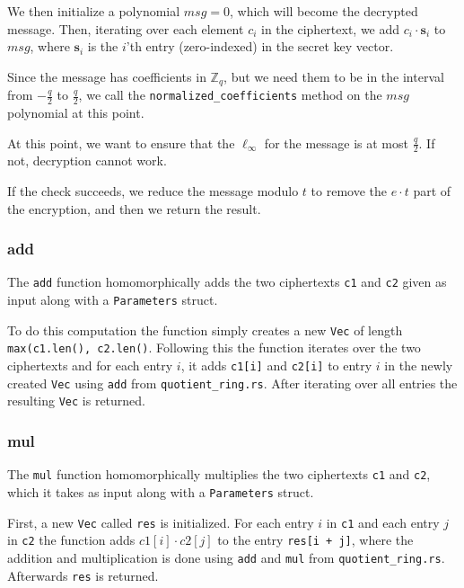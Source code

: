 \documentclass[../main.tex]{subfiles}
\begin{document}
We then initialize a polynomial $msg = 0$, which will become the decrypted message.
Then, iterating over each element $c_i$ in the ciphertext, we add $c_i \cdot \mathbf{s}_i$ to $msg$, where $\mathbf{s}_i$ is the $i$'th entry (zero-indexed) in the secret key vector.

Since the message has coefficients in $\mathbb{Z}_q$, but we need them to be in the interval from $-\frac{q}{2}$ to $\frac{q}{2}$, we call the \lstinline{normalized_coefficients} method on the $msg$ polynomial at this point.

At this point, we want to ensure that the $\ell_\infty$ for the message is at most $\frac{q}{2}$.
If not, decryption cannot work.

If the check succeeds, we reduce the message modulo $t$ to remove the $e \cdot t$ part of the encryption, and then we return the result.

\subsubsection{add}
The \lstinline{add} function homomorphically adds the two ciphertexts \lstinline{c1} and \lstinline{c2} given as input along with a \lstinline{Parameters} struct.

To do this computation the function simply creates a new \lstinline{Vec} of length \lstinline{max(c1.len(), c2.len()}.
Following this the function iterates over the two ciphertexts and for each entry $i$, it adds \lstinline{c1[i]} and \lstinline{c2[i]} to entry $i$ in the newly created \lstinline{Vec} using \lstinline{add} from \lstinline{quotient_ring.rs}. After iterating over all entries the resulting \lstinline{Vec} is returned.

\subsubsection{mul}
The \lstinline{mul} function homomorphically multiplies the two ciphertexts \lstinline{c1} and \lstinline{c2}, which it takes as input along with a \lstinline{Parameters} struct.

First, a new \lstinline{Vec} called \lstinline{res} is initialized.
For each entry $i$ in \lstinline{c1} and each entry $j$ in \lstinline{c2} the function adds $c1[i] \cdot c2[j]$ to the entry \lstinline{res[i + j]}, where the addition and multiplication is done using \lstinline{add} and \lstinline{mul} from \lstinline{quotient_ring.rs}.
Afterwards \lstinline{res} is returned.
\end{document}
